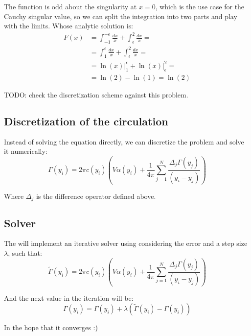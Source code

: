 The function is odd about the singularity at $x=0$, which is the use case for the Cauchy singular value, so we can split the integration into two parts and play with the limits.
Whose analytic solution is:
\begin{align}
    F(x)    &= \int_{-1}^{-\epsilon} \frac{dx}{x} + \int_{\epsilon}^{2} \frac{dx}{x} = \\
            &= \int_{1}^{\epsilon} \frac{dx}{x} + \int_{\epsilon}^{2} \frac{dx}{x} = \\
            &= \left. \ln(x) \right|_{1}^{\epsilon} + \left. \ln(x) \right|_{\epsilon}^{2} = \\
            &= \ln(2) - \ln(1) = \ln (2)
\end{align}

TODO: check the discretization scheme against this problem.

\subsection{Discretization of the circulation}
Instead of solving the equation directly, we can discretize the problem and solve it numerically:
\begin{equation}
    \Gamma(y_i) = 2 \pi c(y_i) \left( V \alpha(y_i) + \frac{1}{4\pi}\sum_{j=1}^{N} \frac{\Delta_j\Gamma(y_j)}{\left(y_i - y_j\right)} \right)
\end{equation}

Where $\Delta_j$ is the difference operator defined above.

\subsection{Solver}
The will implement an iterative solver using considering the error and a step size $\lambda$, such that:
\begin{equation}
    \tilde{\Gamma}(y_i) = 2 \pi c(y_i) \left( V \alpha(y_i) + \frac{1}{4\pi}\sum_{j=1}^{N} \frac{\Delta_j\Gamma(y_j)}{\left(y_i - y_j\right)} \right)
\end{equation}

And the next value in the iteration will be:
\begin{equation}
    \Gamma(y_i) = \Gamma(y_i) + \lambda \left( \tilde{\Gamma}(y_i) - \Gamma(y_i) \right)
\end{equation}

In the hope that it converges :)